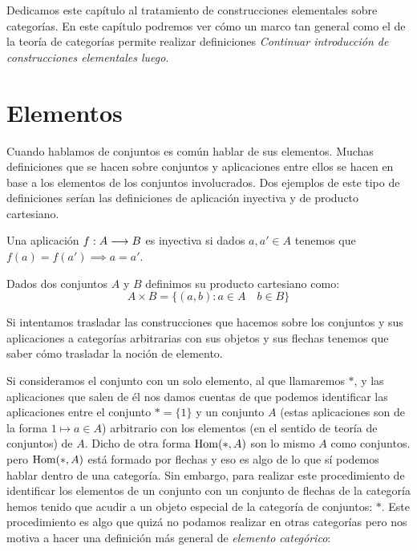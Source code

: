 Dedicamos este capítulo al tratamiento de construcciones elementales
sobre categorías. En este capítulo podremos ver cómo un marco tan general
como el de la teoría de categorías permite realizar definiciones
\textit{Continuar introducción de construcciones elementales luego}.

\section{Elementos}
Cuando hablamos de conjuntos es común hablar de sus elementos. Muchas
definiciones que se hacen sobre conjuntos y aplicaciones entre
ellos se hacen en base a los elementos de los conjuntos involucrados.
Dos ejemplos de este tipo de definiciones serían las definiciones de
aplicación inyectiva y de producto cartesiano.

\begin{definition*}
Una aplicación $f : A\longrightarrow B$ es inyectiva si dados
$a, a' \in A$ tenemos que $f(a) = f(a') \implies a = a'$.
\end{definition*}

\begin{definition*}
Dados dos conjuntos $A$ y $B$ definimos su producto cartesiano
como:
$$A\times B = \{ (a, b) : a \in A \quad b \in B \}$$
\end{definition*}

Si intentamos trasladar las construcciones que hacemos sobre los
conjuntos y sus aplicaciones a categorías arbitrarias con sus objetos
y sus flechas tenemos que saber cómo trasladar la noción de elemento.

Si consideramos el conjunto con un solo elemento, al que llamaremos
$*$, y las aplicaciones que salen de él nos damos cuentas de que podemos
identificar las aplicaciones entre el conjunto $* = \{ 1 \}$ y un conjunto
$A$ (estas aplicaciones son de la forma $1 \mapsto a \in A$)
arbitrario con los elementos (en el sentido de teoría de conjuntos)
de $A$. Dicho de otra forma $\operatorname{Hom}(*, A)$ son lo mismo $A$ como conjuntos.
pero $\operatorname{Hom}(*, A)$ está formado por flechas y eso es algo de lo que
sí podemos hablar dentro de una categoría. Sin embargo, para realizar
este procedimiento de identificar los elementos de un conjunto con
un conjunto de flechas de la categoría hemos tenido que acudir a un
objeto especial de la categoría de conjuntos: $*$. Este procedimiento
es algo que quizá no podamos realizar en otras categorías pero nos
motiva a hacer una definición más general de
\textit{elemento categórico}:


